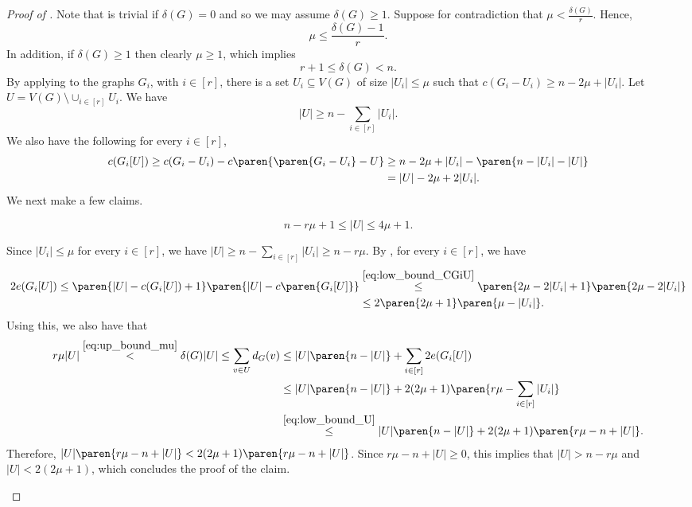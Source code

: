\documentclass[10pt,a4paper,reqno]{amsart}
\begin{document}
\begin{proof}[Proof of ]
Note that  is trivial if $\delta(G) = 0$ and so we may assume $\delta(G) \ge 1$. Suppose for contradiction that $\mu < \frac{\delta(G)}{r}$. Hence,
\begin{equation}\label{eq:up_bound_mu}
    \mu \leq \frac{\delta(G) - 1}{r}.
\end{equation}
In addition, if $\delta(G) \ge 1$ then clearly $\mu \ge 1$, which implies 
\begin{equation}\label{eq:bound_n}
      r +1 \le \delta(G) < n.
\end{equation}
By applying  to the graphs $G_i$, with $i \in [r]$, there is a set $U_i \subseteq V(G)$ of size $|U_i| \leq \mu$ such that $c(G_i - U_i) \geq n - 2\mu + |U_i|$.
Let $U = V(G) \setminus \cup_{i \in [r]} U_i$. We have
\begin{equation}\label{eq:low_bound_U}
    |U| \geq n - \sum_{i \in [r]} |U_i|.
\end{equation}
We also have the following for every $i\in [r]$,
\begin{align}\label{eq:low_bound_CGiU}
    c(G_i[U]) \geq c(G_i - U_i) - c\paren{\paren{G_i - U_i} - U} 
    &\geq n - 2\mu + |U_i| - \paren{n - |U_i| - |U|} \nonumber \\
    &= |U| - 2\mu + 2|U_i|.
\end{align}
We next make a few claims.
\begin{claim}\label{claim:low_sum_ui}
    \begin{equation*}
      n - r\mu + 1 \le |U| \le 4\mu + 1.
    \end{equation*}
\end{claim}
\begin{claimproof}
Since $|U_i| \le \mu$ for every $i\in [r]$, we have $|U| \ge n -\sum_{i \in [r]} |U_i| \ge n - r\mu$. By , for every $i\in [r]$, we have 
\begin{align*}
      2 e(G_i[U]) 
     \leq \paren{|U| - c(G_i[U]) + 1} \paren{|U| - c\paren{G_i[U]}} 
     &\stackrel{\eqref{eq:low_bound_CGiU}}{\leq} \paren{2\mu - 2|U_i| + 1} \paren{2\mu - 2|U_i|} \\
     &\leq 2\paren{2\mu + 1} \paren{\mu - |U_i|}. \\
\end{align*}
Using this, we also have that
\begin{align*}
      r\mu|U| \stackrel{\eqref{eq:up_bound_mu}}{<} \delta(G) |U| \leq \sum_{v \in U} d_G(v) &\leq |U| \paren{n - |U|} + \sum_{i \in [r]} 2e(G_i[U]) \\
      &\leq |U| \paren{n - |U|} + 2(2\mu + 1) \paren{r\mu - \sum_{i\in [r]} |U_i|} \\
      &\stackrel{\eqref{eq:low_bound_U}}{\leq} |U| \paren{n - |U|} + 2(2\mu + 1) \paren{r\mu - n + |U|}.
\end{align*}
Therefore, $|U| \paren{r\mu -n + |U|} < 2(2\mu + 1) \paren{r\mu - n + |U|}$. Since $r \mu - n + |U| \ge 0$, this implies that $|U| > n -  r \mu$ and $|U| < 2(2\mu + 1)$, which concludes the proof of the claim.
\end{claimproof}
  

\end{proof}
\end{document}
